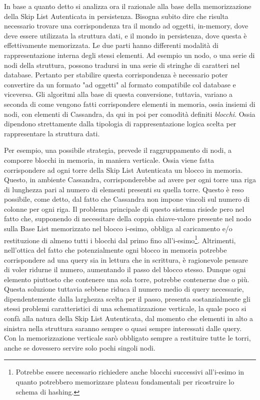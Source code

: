 
		In base a quanto detto si analizza ora il razionale alla base della memorizzazione della Skip List Autenticata in persistenza. Bisogna subito dire che risulta necessario trovare una corrispondenza tra il mondo ad oggetti, in-memory, dove deve essere utilizzata la struttura dati, e il mondo in persistenza, dove questa è effettivamente memorizzata. Le due parti hanno differenti modalità di rappresentazione interna degli stessi elementi. Ad esempio un nodo, o una serie di nodi della struttura, possono tradursi in una serie di stringhe di caratteri nel database. Pertanto per stabilire questa corrispondenza è necessario poter convertire da un formato "ad oggetti" al formato compatibile col database e viceversa.
		Gli algoritmi alla base di questa conversione, tuttavia, variano a seconda di come vengono fatti corrispondere elementi in memoria, ossia insiemi di nodi, con elementi di Cassandra, da qui in poi per comodità definiti \textit{blocchi}. Ossia dipendono strettamente dalla tipologia di rappresentazione logica scelta per rappresentare la struttura dati.
		
		Per esempio, una possibile strategia, prevede il raggruppamento di nodi, a comporre blocchi in memoria, in maniera verticale. Ossia viene fatta corrispondere ad ogni torre della Skip List Autenticata un blocco in memoria. Questo, in ambiente Cassandra, corrisponderebbe ad avere per ogni torre una riga di lunghezza pari al numero di elementi presenti su quella torre. Questo è reso possibile, come detto, dal fatto che Cassandra non impone vincoli sul numero di colonne per ogni riga.
		Il problema principale di questo sistema risiede pero nel fatto che, supponendo di necessitare della coppia chiave-valore presente nel nodo sulla Base List memorizzato nel blocco i-esimo, obbliga al caricamento e/o restituzione di almeno tutti i blocchi dal primo fino all'i-esimo\footnote{Potrebbe essere necessario richiedere anche blocchi successivi all'i-esimo in quanto potrebbero memorizzare plateau fondamentali per ricostruire lo schema di hashing.}.
		Altrimenti, nell'ottica del fatto che potenzialmente ogni blocco in memoria potrebbe corrispondere ad una query sia in lettura che in scrittura, è ragionevole pensare di voler ridurne il numero, aumentando il passo del blocco stesso. Dunque ogni elemento piuttosto che contenere una sola torre, potrebbe contenerne due o più. Questa soluzione tuttavia sebbene riduca il numero medio di query necessarie, dipendentemente dalla larghezza scelta per il passo, presenta sostanzialmente gli stessi problemi caratteristici di una schematizzazione verticale, la quale poco si confà alla natura della Skip List Autenticata, dal momento che elementi in alto a sinistra nella struttura saranno sempre o quasi sempre interessati dalle query. Con la memorizzazione verticale sarò obbligato sempre a restituire tutte le torri, anche se dovessero servire solo pochi singoli nodi.
		
